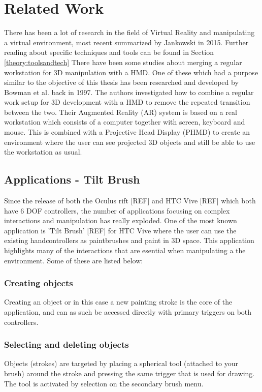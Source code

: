 \chapter{Related Work}
There has been a lot of research in the field of Virtual Reality and manipulating a virtual environment, most recent summarized by Jankowski in 2015. \cite{interactions:Jankowski2015} Further reading about specific techniques and tools can be found in Section \ref{theory:toolsandtech} There have been some studies about merging a regular workstation for 3D manipulation with a HMD. One of these which had a purpose similar to the objective of this thesis has been researched and developed by Bowman et al. back in 1997. \cite{relatedwork:kijimaand1997transition} The authors investigated how to combine a regular work setup for 3D development with a HMD to remove the repeated transition between the two. Their Augmented Reality (AR) system is based on a real workstation which consists of a computer together with screen, keyboard and mouse. This is combined with a Projective Head Display (PHMD) to create an environment where the user can see projected 3D objects and still be able to use the workstation as usual.
\section{Applications - Tilt Brush}
Since the release of both the Oculus rift [REF] and HTC Vive [REF] which both have 6 DOF controllers, the number of applications focusing on complex interactions and manipulation has really exploded. One of the most known application is 'Tilt Brush' [REF] for HTC Vive where the user can use the existing handcontrollers as paintbrushes and paint in 3D space. This application highlights many of the interactions that are esential when manipulating a the environment. Some of these are listed below:
\subsection{Creating objects}
Creating an object or in this case a new painting stroke is the core of the application, and can as such be accessed directly with primary triggers on both controllers.
\subsection{Selecting and deleting objects}
Objects (strokes) are targeted by placing a spherical tool (attached to your brush) around the stroke and pressing the same trigger that is used for drawing. The tool is activated by selection on the secondary brush menu.
